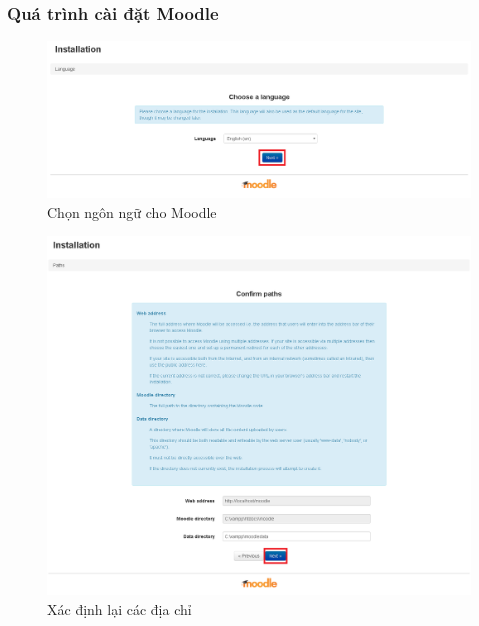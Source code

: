 \newpage
\subsubsection{Quá trình cài đặt Moodle}

\begin{center}
	\begin{figure}[htp]
		\begin{center}
			\includegraphics[width=1\linewidth]{img/choosenn}
		\end{center}
		\caption{Chọn ngôn ngữ cho Moodle}
		\label{refhinh30}
	\end{figure}
\end{center}

\begin{center}
	\begin{figure}[htp]
		\begin{center}
			\includegraphics[width=0.8\linewidth]{img/direct}
		\end{center}
		\caption{Xác định lại các địa chỉ}
		\label{refhinh31}
	\end{figure}
\end{center}

